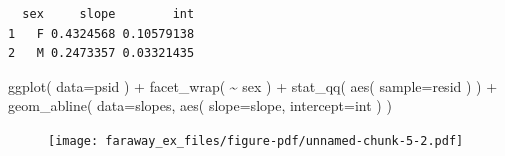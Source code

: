 \documentclass[
  letterpaper,
  DIV=11,
  numbers=noendperiod]{scrreprt}
\newenvironment{Shaded}{\begin{snugshade}}{\end{snugshade}}
\newcommand{\AttributeTok}[1]{\textcolor[rgb]{0.49,0.56,0.16}{#1}}
\newcommand{\CommentTok}[1]{\textcolor[rgb]{0.38,0.63,0.69}{\textit{#1}}}
\newcommand{\ControlFlowTok}[1]{\textcolor[rgb]{0.00,0.44,0.13}{\textbf{#1}}}
\newcommand{\DecValTok}[1]{\textcolor[rgb]{0.25,0.63,0.44}{#1}}
\newcommand{\FloatTok}[1]{\textcolor[rgb]{0.25,0.63,0.44}{#1}}
\newcommand{\FunctionTok}[1]{\textcolor[rgb]{0.02,0.16,0.49}{#1}}
\newcommand{\NormalTok}[1]{\textcolor[rgb]{0.00,0.44,0.13}{#1}}
\newcommand{\OtherTok}[1]{\textcolor[rgb]{0.00,0.44,0.13}{#1}}
\newcommand{\SpecialCharTok}[1]{\textcolor[rgb]{0.25,0.44,0.63}{#1}}
\begin{document}
\begin{Shaded}
\end{Shaded}

\begin{verbatim}
  sex     slope        int
1   F 0.4324568 0.10579138
2   M 0.2473357 0.03321435
\end{verbatim}

\begin{Shaded}
\begin{Highlighting}[]
\FunctionTok{ggplot}\NormalTok{( }\AttributeTok{data=}\NormalTok{psid ) }\SpecialCharTok{+}
    \FunctionTok{facet\_wrap}\NormalTok{( }\SpecialCharTok{\textasciitilde{}}\NormalTok{ sex ) }\SpecialCharTok{+}
    \FunctionTok{stat\_qq}\NormalTok{( }\FunctionTok{aes}\NormalTok{( }\AttributeTok{sample=}\NormalTok{resid ) ) }\SpecialCharTok{+}
    \FunctionTok{geom\_abline}\NormalTok{( }\AttributeTok{data=}\NormalTok{slopes, }\FunctionTok{aes}\NormalTok{( }\AttributeTok{slope=}\NormalTok{slope, }\AttributeTok{intercept=}\NormalTok{int ) )}
\end{Highlighting}
\end{Shaded}

\begin{figure}[H]

{\centering \texttt{[image: faraway\_ex\_files/figure-pdf/unnamed-chunk-5-2.pdf]}

}

\end{figure}
\end{document}
